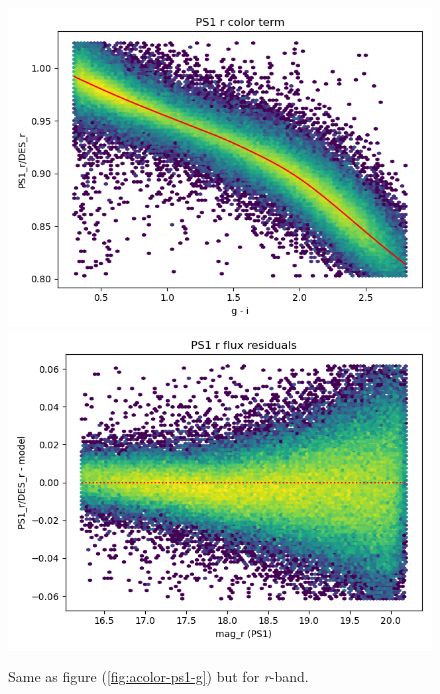 \begin{figure}
    \includegraphics[width=0.49\linewidth]{./figures/color_terms/PS1_to_DES_band_r_color_term.png}
    \includegraphics[width=0.49\linewidth]{./figures/color_terms/PS1_to_DES_band_r_flux_residuals.png}
    \caption{Same as figure (\ref{fig:acolor-ps1-g}) but for \textit{r}-band.}
   
\end{figure}

